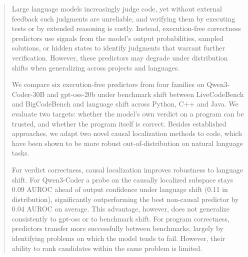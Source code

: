 \documentclass[10pt,conference]{IEEEtran}
\begin{document}
\maketitle

\begin{abstract}
Large language models increasingly judge code, %
yet without external feedback such judgments are unreliable, and verifying them by
executing tests or by extended reasoning is costly. %
Instead, execution-free correctness predictors use signals from the model's output probabilities, sampled solutions, or hidden states to identify judgments that warrant further verification.
However, 
these predictors 
may degrade under distribution
shifts 
when generalizing across projects and languages. 

We compare six execution-free predictors from four families on Qwen3-Coder-30B and gpt-oss-20b under benchmark shift between LiveCodeBench and BigCodeBench and language shift across Python, C++ and Java.
We evaluate two targets: whether the model's own verdict on a program can be trusted, and whether the program itself is correct.
Besides established approaches, we adapt two novel causal localization methods to code, which have been shown to be more robust out-of-distribution on natural language tasks. 

For verdict correctness, causal localization improves robustness to language shift. For Qwen3-Coder a probe on the causally localized subspace stays 0.09 AUROC ahead of output confidence under language shift (0.11 in distribution), significantly outperforming the best non-causal predictor by 0.04 AUROC on average.
This advantage, however, does not generalize consistently to gpt-oss or to benchmark shift. For program correctness, predictors transfer more successfully between benchmarks, largely by identifying problems on which the model tends to fail. However, their ability to rank candidates within the same problem is limited. %

\end{abstract}
\end{document}
